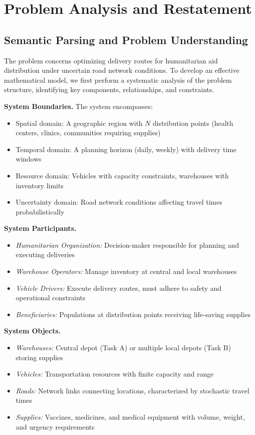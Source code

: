 \section{Problem Analysis and Restatement}
\label{sec:problem_analysis}

\subsection{Semantic Parsing and Problem Understanding}

The problem concerns optimizing delivery routes for humanitarian aid distribution under uncertain road network conditions. To develop an effective mathematical model, we first perform a systematic analysis of the problem structure, identifying key components, relationships, and constraints.

\textbf{System Boundaries.} The system encompasses:
\begin{itemize}
\item Spatial domain: A geographic region with $N$ distribution points (health centers, clinics, communities requiring supplies)
\item Temporal domain: A planning horizon (daily, weekly) with delivery time windows
\item Resource domain: Vehicles with capacity constraints, warehouses with inventory limits
\item Uncertainty domain: Road network conditions affecting travel times probabilistically
\end{itemize}

\textbf{System Participants.}
\begin{itemize}
\item \textit{Humanitarian Organization:} Decision-maker responsible for planning and executing deliveries
\item \textit{Warehouse Operators:} Manage inventory at central and local warehouses
\item \textit{Vehicle Drivers:} Execute delivery routes, must adhere to safety and operational constraints
\item \textit{Beneficiaries:} Populations at distribution points receiving life-saving supplies
\end{itemize}

\textbf{System Objects.}
\begin{itemize}
\item \textit{Warehouses:} Central depot (Task A) or multiple local depots (Task B) storing supplies
\item \textit{Vehicles:} Transportation resources with finite capacity and range
\item \textit{Roads:} Network links connecting locations, characterized by stochastic travel times
\item \textit{Supplies:} Vaccines, medicines, and medical equipment with volume, weight, and urgency requirements
\end{itemize}

